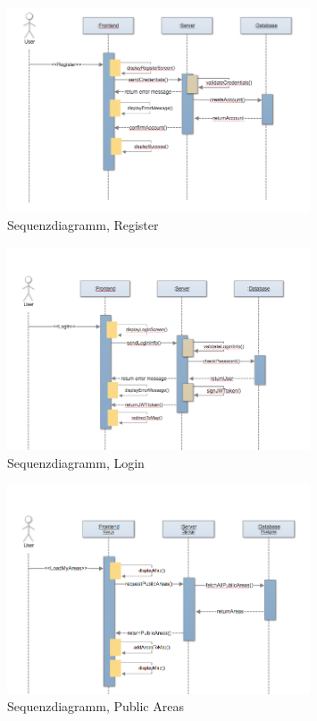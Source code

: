 \begin{figure}[H]
\centering
    \includegraphics[width=0.8\textwidth]{Sequenz_DiagrammRegister}
    \caption{Sequenzdiagramm, Register}
    \label{fig:sd1}
\end{figure}

\begin{figure}[H]
\centering
    \includegraphics[width=0.8\textwidth]{Sequenz_DiagrammLogin}
    \caption{Sequenzdiagramm, Login}
    \label{fig:sd2}
\end{figure}

\begin{figure}[H]
\centering
    \includegraphics[width=0.8\textwidth]{Sequenz_DiagrammPublicAreas}
    \caption{Sequenzdiagramm, Public Areas}
    \label{fig:sd3}
\end{figure}

